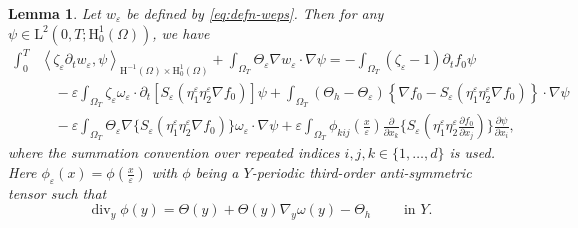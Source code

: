 \documentclass[preprint, 12pt]{amsart}
\numberwithin{equation}{section}
\newtheorem{lemma}[theorem]{Lemma}
\numberwithin{equation}{section}
\newcommand{\eps}{\varepsilon}
\DeclareMathOperator{\dv}{div}
\begin{document}
\begin{lemma}
Let $w_\eps$ be defined by \eqref{eq:defn-weps}. Then for any $\psi\in\mathrm L^2(0,T;\mathrm H^1_0(\Omega))$, we have
\begin{equation}\label{eq:wkform-lemma}
\begin{aligned}
\int_0^T & \left\langle \zeta_\eps\partial_{t}w_{\varepsilon},\psi \right\rangle_{\mathrm{H}^{-1}(\Omega) \times \mathrm{H}_0^1(\Omega)} 
+ \int_{\Omega_T} \Theta_\eps\nabla w_{\varepsilon} \cdot \nabla \psi 
= - \int_{\Omega_T} (\zeta_\eps -1)\partial_{t}f_{0}\psi 
\\
& \quad - \eps \int_{\Omega_T} \zeta_\eps \omega_\eps \cdot \partial_t \left[S_\eps (\eta_1^\eps \eta_2^\eps \nabla f_0)\right] \psi 
+\int_{\Omega_T}\left(\Theta_h - \Theta_\eps\right) \left\{\nabla f_0 - S_\eps(\eta_1^\eps\eta_2^\eps \nabla f_0)\right\} \cdot \nabla \psi
\\
& \quad 
- \eps \int_{\Omega_T} \Theta_\eps \nabla \bigg\{S_{\varepsilon}(\eta_1^\eps \eta_2^\eps \nabla f_0)\bigg\}\omega_\eps \cdot \nabla \psi
+ \eps \int_{\Omega_T} \phi_{kij}\left(\frac{x}{\eps}\right) \frac{\partial}{\partial x_k} \bigg\{S_{\varepsilon}\left(\eta_1^\eps \eta_2^\eps \frac{\partial f_0}{\partial x_j} \right)\bigg\} \frac{\partial\psi}{\partial x_i},
\end{aligned}
\end{equation}
where the summation convention over repeated indices $i,j,k\in\{1,\dots,d\}$ is used.\\
Here $\phi_\eps(x) = \phi \left(\frac{x}{\eps}\right)$ with $\phi$ being a $Y$-periodic third-order anti-symmetric tensor such that
\begin{equation}\label{eq:div-phi-B}
\dv_y \phi(y) = \Theta(y) + \Theta(y)\nabla_y\omega(y) - \Theta_h \qquad \mbox{ in }Y.
\end{equation}
\end{lemma}
\end{document}
